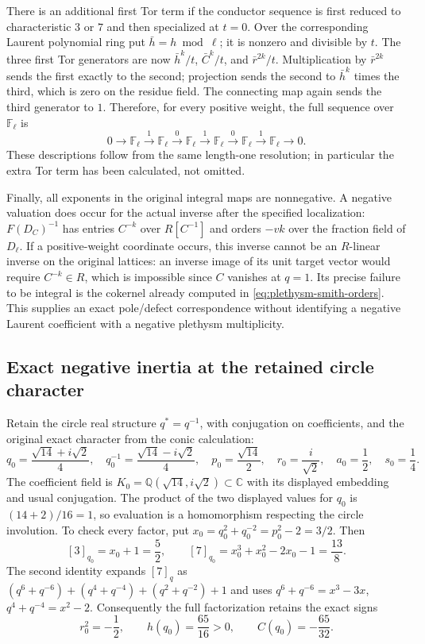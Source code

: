 There is an additional first Tor term if the conductor sequence is
first reduced to characteristic $3$ or $7$ and then specialized at
$t=0$. Over the corresponding Laurent polynomial ring put
$\bar h=h\bmod\ell$; it is nonzero and divisible by $t$.
The three first Tor generators are now
$\bar h^k/t$, $\bar C^k/t$, and $\bar r^{2k}/t$.
Multiplication by $\bar r^{2k}$ sends the first exactly to the
second; projection sends the second to $\bar h^k$ times the third,
which is zero on the residue field. The connecting map again sends
the third generator to $1$. Therefore, for every positive weight,
the full sequence over $\mathbb F_\ell$ is
\[
 0\longrightarrow\mathbb F_\ell\xrightarrow{1}\mathbb F_\ell
 \xrightarrow{0}\mathbb F_\ell\xrightarrow{1}\mathbb F_\ell
 \xrightarrow{0}\mathbb F_\ell\xrightarrow{1}\mathbb F_\ell
 \longrightarrow0.
\]
These descriptions follow from the same length-one resolution;
in particular the extra Tor term has been calculated, not omitted.

Finally, all exponents in the original integral maps are nonnegative.
A negative valuation does occur for the actual inverse after the
specified localization: $F(D_C)^{-1}$ has entries $C^{-k}$ over
$R[C^{-1}]$ and orders $-vk$ over the fraction field of $D_\ell$.
If a positive-weight coordinate occurs, this inverse cannot be an
$R$-linear inverse on the original lattices: an inverse image of its
unit target vector would require $C^{-k}\in R$, which is impossible
since $C$ vanishes at $q=1$. Its precise failure to be integral is
the cokernel already computed in
\eqref{eq:plethysm-smith-orders}. This supplies an exact pole/defect
correspondence without identifying a negative Laurent coefficient
with a negative plethysm multiplicity.

\subsection{Exact negative inertia at the retained circle character}

Retain the circle real structure $q^*=q^{-1}$, with conjugation on
coefficients, and the original exact character from the conic calculation:
\[
 q_0=\frac{\sqrt{14}+i\sqrt2}{4},\quad
 q_0^{-1}=\frac{\sqrt{14}-i\sqrt2}{4},\quad
 p_0=\frac{\sqrt{14}}2,\quad r_0=\frac{i}{\sqrt2},\quad
 a_0=\frac12,\quad s_0=\frac14.
\]
The coefficient field is $K_0=\mathbb Q(\sqrt{14},i\sqrt2)\subset\mathbb C$
with its displayed embedding and usual conjugation. The product of the
two displayed values for $q_0$ is $(14+2)/16=1$, so evaluation is a
homomorphism respecting the circle involution. To check every factor,
put $x_0=q_0^2+q_0^{-2}=p_0^2-2=3/2$. Then
\[
 [3]_{q_0}=x_0+1=\frac52,\qquad
 [7]_{q_0}=x_0^3+x_0^2-2x_0-1=\frac{13}{8}.
\]
The second identity expands $[7]_q$ as
$(q^6+q^{-6})+(q^4+q^{-4})+(q^2+q^{-2})+1$
and uses $q^6+q^{-6}=x^3-3x$, $q^4+q^{-4}=x^2-2$.
Consequently the full factorization retains the exact signs
\begin{equation}\label{eq:plethysm-circle-coefficient}
 r_0^2=-\frac12,\qquad h(q_0)=\frac{65}{16}>0,
 \qquad C(q_0)=-\frac{65}{32}.
\end{equation}

